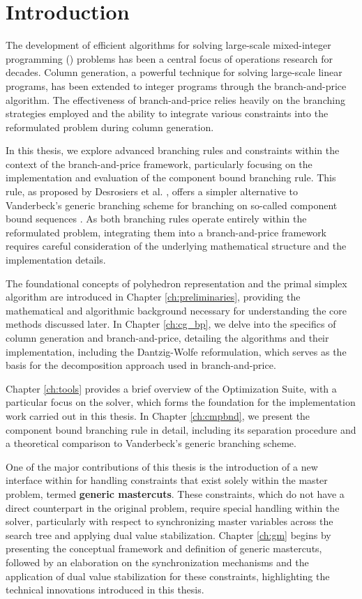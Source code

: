 \chapter{Introduction}
The development of efficient algorithms for solving large-scale mixed-integer programming (\MIP{}) problems has been a central focus of operations research for decades. Column generation, a powerful technique for solving large-scale linear programs, has been extended to integer programs through the branch-and-price algorithm. The effectiveness of branch-and-price relies heavily on the branching strategies employed and the ability to integrate various constraints into the reformulated problem during column generation.

In this thesis, we explore advanced branching rules and constraints within the context of the branch-and-price framework, particularly focusing on the implementation and evaluation of the component bound branching rule. This rule, as proposed by Desrosiers et al. \cite{thebook}, offers a simpler alternative to Vanderbeck's generic branching scheme \cite{vanderbeck2011branching} for branching on so-called component bound sequences \cite{vanderbeck1996exact}. As both branching rules operate entirely within the reformulated problem, integrating them into a branch-and-price framework requires careful consideration of the underlying mathematical structure and the implementation details.

The foundational concepts of polyhedron representation and the primal simplex algorithm are introduced in Chapter \ref{ch:preliminaries}, providing the mathematical and algorithmic background necessary for understanding the core methods discussed later. In Chapter \ref{ch:cg_bp}, we delve into the specifics of column generation and branch-and-price, detailing the algorithms and their implementation, including the Dantzig-Wolfe reformulation, which serves as the basis for the decomposition approach used in branch-and-price.

Chapter \ref{ch:tools} provides a brief overview of the \SCIP{} Optimization Suite, with a particular focus on the \GCG{} solver, which forms the foundation for the implementation work carried out in this thesis. In Chapter \ref{ch:cmpbnd}, we present the component bound branching rule in detail, including its separation procedure and a theoretical comparison to Vanderbeck's generic branching scheme.

One of the major contributions of this thesis is the introduction of a new interface within \GCG{} for handling constraints that exist solely within the master problem, termed \textbf{generic mastercuts}. These constraints, which do not have a direct counterpart in the original problem, require special handling within the solver, particularly with respect to synchronizing master variables across the search tree and applying dual value stabilization. Chapter \ref{ch:gm} begins by presenting the conceptual framework and definition of generic mastercuts, followed by an elaboration on the synchronization mechanisms and the application of dual value stabilization for these constraints, highlighting the technical innovations introduced in this thesis.


